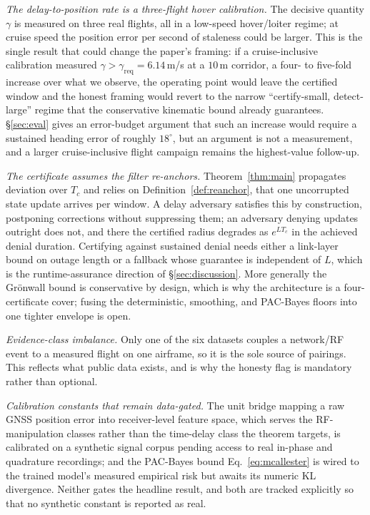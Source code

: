 \emph{The delay-to-position rate is a three-flight hover calibration.} The
decisive quantity $\gamma$ is measured on three real flights, all in a low-speed
hover/loiter regime; at cruise speed the position error per second of staleness
could be larger. This is the single result that could change the paper's
framing: if a cruise-inclusive calibration measured
$\gamma>\gamma_{\mathrm{req}}=6.14$\,m/s at a $10$\,m corridor, a
four- to five-fold increase over what we observe, the operating point would
leave the certified window and the honest framing would revert to the narrow
``certify-small, detect-large'' regime that the conservative kinematic bound
already guarantees. \S\ref{sec:eval} gives an error-budget argument that such an
increase would require a sustained heading error of roughly $18^\circ$, but an
argument is not a measurement, and a larger cruise-inclusive flight campaign
remains the highest-value follow-up.

\emph{The certificate assumes the filter re-anchors.} Theorem~\ref{thm:main}
propagates deviation over $T_c$ and relies on Definition~\ref{def:reanchor},
that one uncorrupted state update arrives per window. A delay adversary
satisfies this by construction, postponing corrections without suppressing them;
an adversary denying updates outright does not, and there the certified radius
degrades as $e^{LT_c}$ in the achieved denial duration. Certifying against
sustained denial needs either a link-layer bound on outage length or a fallback
whose guarantee is independent of $L$, which is the runtime-assurance direction
of \S\ref{sec:discussion}. More generally the Gr\"onwall bound is conservative
by design, which is why the architecture is a four-certificate cover; fusing the
deterministic, smoothing, and PAC-Bayes floors into one tighter envelope is
open.

\emph{Evidence-class imbalance.} Only one of the six datasets couples a
network/RF event to a measured flight on one airframe, so it is the sole source
of  pairings. This reflects what public data
exists, and is why the honesty flag is mandatory rather than optional.

\emph{Calibration constants that remain data-gated.} The unit bridge mapping a
raw GNSS position error into receiver-level feature space, which serves the
RF-manipulation classes rather than the time-delay class the theorem targets, is
calibrated on a synthetic signal corpus pending access to real in-phase and
quadrature recordings; and the PAC-Bayes bound Eq.~\eqref{eq:mcallester} is
wired to the trained model's measured empirical risk but awaits its numeric KL
divergence. Neither gates the headline result, and both are tracked explicitly
so that no synthetic constant is reported as real.

